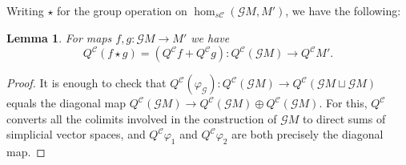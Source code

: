\documentclass[11pt]{amsart} \renewcommand{\baselinestretch}{1.2}
\theoremstyle{plain}
\newtheorem{lem}[thm]{Lemma}
\numberwithin{equation}{section} %
\theoremstyle{plain}
\newtheorem{lem}[thm]{Lemma}
\numberwithin{equation}{chapter} %
\let\phi\varphi
\renewcommand{\to}{\longrightarrow}
\newcommand{\scrG}{\mathscr{G}}
\newcommand{\calc}{\mathcal{C}}
\newcommand{\BSW}{{\scrG}}
\newcommand{\Id}{\mathrm{id}}
\begin{document}
\begin{Comp funct sseqs}
Writing $\star$ for the group operation on $\hom_{s\calc}(\BSW M,M')$, we have the following:
\begin{lem}
For maps $f,g:\BSW M\to M'$ we have 
\[Q^{\calc}(f\star g)=(Q^{\calc}f+Q^{\calc}g):Q^{\calc}(\BSW M)\to Q^{\calc}M'.\]
\end{lem}
\begin{proof}
It is enough to check that $Q^{\calc}(\phi_\BSW ):Q^{\calc}(\BSW M)\to Q^{\calc}(\BSW M\sqcup \BSW M)$ equals the diagonal map $Q^{\calc}(\BSW M)\to Q^{\calc}(\BSW M)\oplus Q^{\calc}(\BSW M)$. For this, $Q^{\calc}$ converts all the colimits involved in the construction of $\BSW M$ to direct sums of simplicial vector spaces, and $Q^{\calc}\phi_1$ and $Q^{\calc}\phi_2$ are both precisely the diagonal map.
\end{proof}


\end{Comp funct sseqs}
\end{document}
